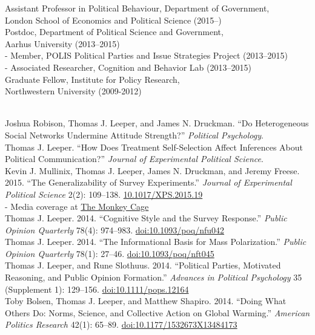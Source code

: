\documentclass[12pt]{article}
\renewcommand{\section}[1]{\pagebreak[3]%
    \llap{\scshape\smash{\parbox[t]{\marginparwidth}{\raggedright {\color{lg}#1}}}}%
    \vspace{-\baselineskip}\par}
\newcommand{\topic}[1]{\pagebreak[3]\indent {\color{lg}{\footnotesize #1 }}\\}
\newcommand{\entry}[1]{\indent {\color{lg}\guillemotright}\hspace{2pt}#1\vspace{.25em}\\}
\newcommand{\subentry}[1]{{\color{lg}-} #1\vspace{.25em}\\}
\begin{document}
\section{Academic Appointments}
\entry{Assistant Professor in Political Behaviour, Department of Government,\\ London School of Economics and Political Science (2015--)}
\entry{Postdoc, Department of Political Science and Government,\\ Aarhus University (2013--2015)}
	\subentry{Member, POLIS Political Parties and Issue Strategies Project (2013--2015)}
	\subentry{Associated Researcher, Cognition and Behavior Lab (2013--2015)}
\entry{Graduate Fellow, Institute for Policy Research,\\ Northwestern University (2009-2012)}

\section{Publications}
\topic{Peer-Reviewed Publications: Political Science}
	\entry{Joshua Robison, Thomas J. Leeper, and James N. Druckman. ``Do Heterogeneous Social Networks Undermine Attitude Strength?'' \textit{Political Psychology}.}
	\entry{Thomas J. Leeper. ``How Does Treatment Self-Selection Affect Inferences About Political Communication?'' \textit{Journal of Experimental Political Science}.}
	\entry{Kevin J. Mullinix, Thomas J. Leeper, James N. Druckman, and Jeremy Freese. 2015. ``The Generalizability of Survey Experiments.'' \textit{Journal of Experimental Political Science} 2(2): 109--138. \href{http://dx.doi.org/10.1017/XPS.2015.19}{10.1017/XPS.2015.19}}
		\subentry{Media coverage at \href{https://www.washingtonpost.com/news/monkey-cage/wp/2016/03/09/does-social-science-have-a-replication-crisis/}{The Monkey Cage}}
	\entry{Thomas J. Leeper. 2014. ``Cognitive Style and the Survey Response.'' \textit{Public Opinion Quarterly} 78(4): 974--983. \href{http://dx.doi.org/10.1093/poq/nfu042}{doi:10.1093/poq/nfu042}}
	\entry{Thomas J. Leeper. 2014. ``The Informational Basis for Mass Polarization.'' \textit{Public Opinion Quarterly} 78(1): 27--46. \href{http://dx.doi.org/10.1093/poq/nft045}{doi:10.1093/poq/nft045}}
	\entry{Thomas J. Leeper, and Rune Slothuus. 2014. ``Political Parties, Motivated Reasoning, and Public Opinion Formation.'' \textit{Advances in Political Psychology} 35 (Supplement 1): 129--156. \href{http://dx.doi.org/10.1111/pops.12164}{doi:10.1111/pops.12164}}
	\entry{Toby Bolsen, Thomas J. Leeper, and Matthew Shapiro. 2014. ``Doing What Others Do: Norms, Science, and Collective Action on Global Warming.'' \textit{American Politics Research} 42(1): 65--89. \href{http://dx.doi.org/10.1177/1532673X13484173}{doi:10.1177/1532673X13484173}}
\end{document}
